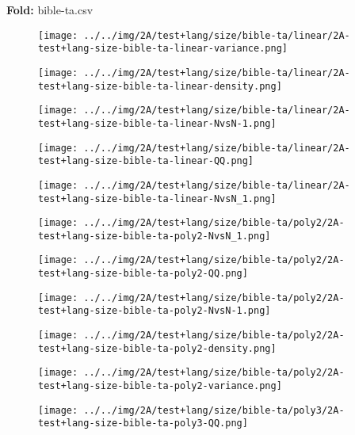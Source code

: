 \textbf{Fold:} bible-ta.csv
\begin{figure}[H]
\centering	\texttt{[image: ../../img/2A/test+lang/size/bible-ta/linear/2A-test+lang-size-bible-ta-linear-variance.png]}
\end{figure}
\begin{figure}[H]
\centering	\texttt{[image: ../../img/2A/test+lang/size/bible-ta/linear/2A-test+lang-size-bible-ta-linear-density.png]}
\end{figure}
\begin{figure}[H]
\centering	\texttt{[image: ../../img/2A/test+lang/size/bible-ta/linear/2A-test+lang-size-bible-ta-linear-NvsN-1.png]}
\end{figure}
\begin{figure}[H]
\centering	\texttt{[image: ../../img/2A/test+lang/size/bible-ta/linear/2A-test+lang-size-bible-ta-linear-QQ.png]}
\end{figure}
\begin{figure}[H]
\centering	\texttt{[image: ../../img/2A/test+lang/size/bible-ta/linear/2A-test+lang-size-bible-ta-linear-NvsN\_1.png]}
\end{figure}
\begin{figure}[H]
\centering	\texttt{[image: ../../img/2A/test+lang/size/bible-ta/poly2/2A-test+lang-size-bible-ta-poly2-NvsN\_1.png]}
\end{figure}
\begin{figure}[H]
\centering	\texttt{[image: ../../img/2A/test+lang/size/bible-ta/poly2/2A-test+lang-size-bible-ta-poly2-QQ.png]}
\end{figure}
\begin{figure}[H]
\centering	\texttt{[image: ../../img/2A/test+lang/size/bible-ta/poly2/2A-test+lang-size-bible-ta-poly2-NvsN-1.png]}
\end{figure}
\begin{figure}[H]
\centering	\texttt{[image: ../../img/2A/test+lang/size/bible-ta/poly2/2A-test+lang-size-bible-ta-poly2-density.png]}
\end{figure}
\begin{figure}[H]
\centering	\texttt{[image: ../../img/2A/test+lang/size/bible-ta/poly2/2A-test+lang-size-bible-ta-poly2-variance.png]}
\end{figure}
\begin{figure}[H]
\centering	\texttt{[image: ../../img/2A/test+lang/size/bible-ta/poly3/2A-test+lang-size-bible-ta-poly3-QQ.png]}
\end{figure}
